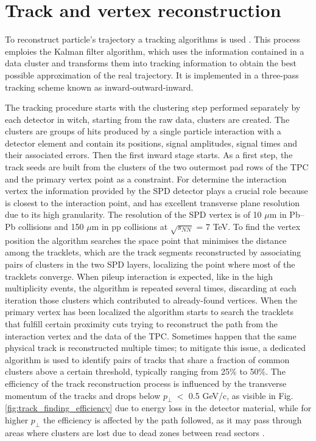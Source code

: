 \documentclass[12pt,a4paper]{book}
\begin{document}
\section{Track and vertex reconstruction} \label{cap:5.3}

To reconstruct particle's trajectory a tracking algorithms is used \cite{Cheng:2908766}.  This process emploies the Kalman filter algorithm, which uses the information contained in a data cluster and transforms them into tracking information to obtain the best possible approximation of the real trajectory. It is implemented in a three-pass tracking scheme known as inward-outward-inward. 

The tracking procedure starts with the clustering step performed separately by each detector in witch, starting from the raw data, clusters are created. The clusters are groups of hits produced by a single particle interaction with a detector element and contain its positions, signal amplitudes, signal times and their associated errors. Then the first inward stage starts. As a first step, the track seeds are built from the clusters of the two outermost pad rows of the TPC and the primary vertex point as a constraint. For determine the interaction vertex the information provided by the SPD detector plays a crucial role because is closest to the interaction point, and has excellent transverse plane resolution due to its high granularity. The resolution of the SPD vertex is of 10 $\mu$m in Pb–Pb collisions and 150 $\mu$m in pp collisions at $\sqrt{s_{NN}}$ = 7 TeV. To find the vertex position the algorithm searches the space point that minimises the distance among the tracklets, which are the track segments reconstructed by associating pairs of clusters in the two SPD layers, localizing the point where most of the tracklets converge. When pileup interaction is expected, like in the high multiplicity events,  the algorithm is repeated several times, discarding at each iteration those clusters which contributed to already-found vertices. When the primary vertex has been localized the algorithm starts to search the tracklets that fulfill certain proximity cuts trying to reconstruct the path from the interaction vertex and the data of the TPC. Sometimes happen that the same physical track is reconstructed multiple times; to mitigate this issue, a dedicated algorithm is used to identify pairs of tracks that share a fraction of common clusters above a certain threshold, typically ranging from 25\% to 50\%. 
The efficiency of the track reconstruction process is influenced by the transverse momentum of the tracks and drops below $p_\perp \ <$ 0.5 GeV/c, as visible in Fig. \ref{fig:track_finding_efficiency} due to energy loss in the detector material, while for higher $p_\perp$ the efficiency is affected by the path followed, as it may pass through areas where clusters are lost due to dead zones between read sectors \cite{Padhan:2924203}.
\end{document}
